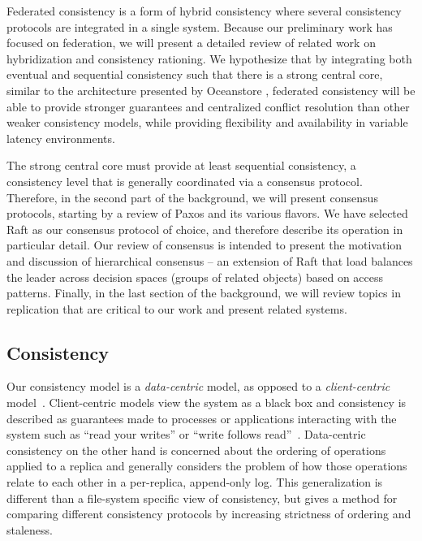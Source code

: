 \documentclass{article}
\begin{document}
Federated consistency is a form of hybrid consistency where several consistency protocols are integrated in a single system. Because our preliminary work has focused on federation, we will present a detailed review of related work on hybridization and consistency rationing. We hypothesize that by integrating both eventual and sequential consistency such that there is a strong central core, similar to the architecture presented by Oceanstore \cite{kubiatowicz_oceanstore:_2000}, federated consistency will be able to provide stronger guarantees and centralized conflict resolution than other weaker consistency models, while providing flexibility and availability in variable latency environments.

The strong central core must provide at least sequential consistency, a consistency level that is generally coordinated via a consensus protocol. Therefore, in the second part of the background, we will present consensus protocols, starting by a review of Paxos \cite{paxos,lamport_paxos_2001} and its various flavors. We have selected Raft \cite{ongaro_search_2014} as our consensus protocol of choice, and therefore describe its operation in particular detail. Our review of consensus is intended to present the motivation and discussion of hierarchical consensus -- an extension of Raft that load balances the leader across decision spaces (groups of related objects) based on access patterns. Finally, in the last section of the background, we will review topics in replication that are critical to our work and present related systems.

\subsection{Consistency}
\label{sec:consistency}

Our consistency model is a \textit{data-centric} model, as opposed to a \textit{client-centric} model~\cite{bermbach_consistency_2013}. Client-centric models view the system as a black box and consistency is described as guarantees made to processes or applications interacting with the system such as ``read your writes'' or ``write follows read''~\cite{vogels_eventually_2009}. Data-centric consistency on the other hand is concerned about the ordering of operations applied to a replica and generally considers the problem of how those operations relate to each other in a per-replica, append-only log. This generalization is different than a file-system specific view of consistency, but gives a method for comparing different consistency protocols by increasing strictness of ordering and staleness.
\end{document}
